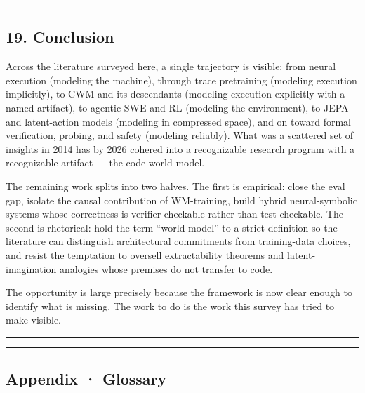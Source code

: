 \documentclass{article}
\begin{document}
\begin{center}\rule{0.5\linewidth}{0.5pt}\end{center}

\hypertarget{conclusion}{%
\subsection{19. Conclusion}\label{conclusion}}

Across the literature surveyed here, a single trajectory is visible:
from neural execution (modeling the machine), through trace pretraining
(modeling execution implicitly), to CWM and its descendants (modeling
execution explicitly with a named artifact), to agentic SWE and RL
(modeling the environment), to JEPA and latent-action models (modeling
in compressed space), and on toward formal verification, probing, and
safety (modeling reliably). What was a scattered set of insights in 2014
has by 2026 cohered into a recognizable research program with a
recognizable artifact --- the code world model.

The remaining work splits into two halves. The first is empirical: close
the eval gap, isolate the causal contribution of WM-training, build
hybrid neural-symbolic systems whose correctness is verifier-checkable
rather than test-checkable. The second is rhetorical: hold the term
``world model'' to a strict definition so the literature can distinguish
architectural commitments from training-data choices, and resist the
temptation to oversell extractability theorems and latent-imagination
analogies whose premises do not transfer to code.

The opportunity is large precisely because the framework is now clear
enough to identify what is missing. The work to do is the work this
survey has tried to make visible.

\begin{center}\rule{0.5\linewidth}{0.5pt}\end{center}

\begin{center}\rule{0.5\linewidth}{0.5pt}\end{center}

\hypertarget{appendix-glossary}{%
\subsection{Appendix · Glossary}\label{appendix-glossary}}
\end{document}
